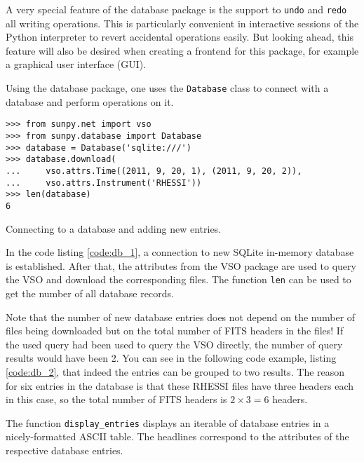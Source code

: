A very special feature of the database package is the support to \texttt{undo}
and \texttt{redo} all writing operations. This is particularly convenient in
interactive sessions of the Python interpreter to revert accidental operations
easily. But looking ahead, this feature will also be desired when creating a
frontend for this package, for example a graphical user interface
(\textsc{GUI}).

Using the database package, one uses the \texttt{Database} class to connect
with a database and perform operations on it.

\begin{listing}
\begin{verbatim}
>>> from sunpy.net import vso
>>> from sunpy.database import Database
>>> database = Database('sqlite:///')
>>> database.download(
...     vso.attrs.Time((2011, 9, 20, 1), (2011, 9, 20, 2)),
...     vso.attrs.Instrument('RHESSI'))
>>> len(database)
6
\end{verbatim}
\caption{Connecting to a database and adding new entries.}
\label{code:db_1}
\end{listing}

In the code listing \ref{code:db_1}, a connection to new SQLite in-memory
database is established. After that, the attributes from the \textsc{VSO}
package are used to query the \textsc{VSO} and download the corresponding
files. The function \texttt{len} can be used to get the number of all database
records.

Note that the number of new database entries does not depend on the
number of files being downloaded but on the total number of \textsc{FITS}
headers in the files! If the used query had been used to query the \textsc{VSO}
directly, the number of query results would have been 2. You can see in the
following code example, listing \ref{code:db_2}, that indeed the entries can
be grouped to two results. The reason for six entries in the database is that
these RHESSI files have three headers each in this case, so the total number of
FITS headers is $2 \times 3 = 6$ headers.

The function \texttt{display\_entries} displays an iterable of database entries
in a nicely-formatted \textsc{ASCII} table. The headlines correspond to the
attributes of the respective database entries.

